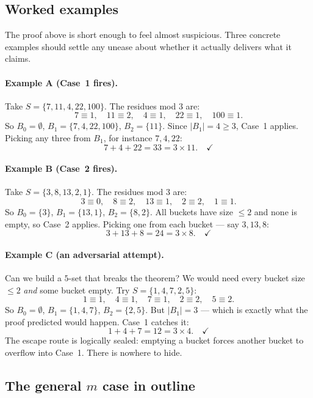 \documentclass[11pt,a4paper]{article}
\theoremstyle{plain}
\theoremstyle{definition}
\theoremstyle{remark}
\begin{document}
\subsection*{Worked examples}

The proof above is short enough to feel almost suspicious. Three concrete examples should settle any unease about whether it actually delivers what it claims.

\paragraph{Example A (Case~1 fires).}
Take $S = \{7, 11, 4, 22, 100\}$. The residues mod $3$ are:
\[
7 \equiv 1, \quad 11 \equiv 2, \quad 4 \equiv 1, \quad 22 \equiv 1, \quad 100 \equiv 1.
\]
So $B_0 = \emptyset$, $B_1 = \{7, 4, 22, 100\}$, $B_2 = \{11\}$. Since $|B_1| = 4 \geq 3$, Case~1 applies. Picking any three from $B_1$, for instance $7, 4, 22$:
\[
7 + 4 + 22 = 33 = 3 \times 11. \quad \checkmark
\]

\paragraph{Example B (Case~2 fires).}
Take $S = \{3, 8, 13, 2, 1\}$. The residues mod $3$ are:
\[
3 \equiv 0, \quad 8 \equiv 2, \quad 13 \equiv 1, \quad 2 \equiv 2, \quad 1 \equiv 1.
\]
So $B_0 = \{3\}$, $B_1 = \{13, 1\}$, $B_2 = \{8, 2\}$. All buckets have size $\leq 2$ and none is empty, so Case~2 applies. Picking one from each bucket --- say $3, 13, 8$:
\[
3 + 13 + 8 = 24 = 3 \times 8. \quad \checkmark
\]

\paragraph{Example C (an adversarial attempt).}
Can we build a $5$-set that breaks the theorem? We would need every bucket size $\leq 2$ \emph{and} some bucket empty. Try $S = \{1, 4, 7, 2, 5\}$:
\[
1 \equiv 1, \quad 4 \equiv 1, \quad 7 \equiv 1, \quad 2 \equiv 2, \quad 5 \equiv 2.
\]
So $B_0 = \emptyset$, $B_1 = \{1, 4, 7\}$, $B_2 = \{2, 5\}$. But $|B_1| = 3$ --- which is exactly what the proof predicted would happen. Case~1 catches it:
\[
1 + 4 + 7 = 12 = 3 \times 4. \quad \checkmark
\]
The escape route is logically sealed: emptying a bucket forces another bucket to overflow into Case~1. There is nowhere to hide.

\subsection*{The general $m$ case in outline}
\end{document}
